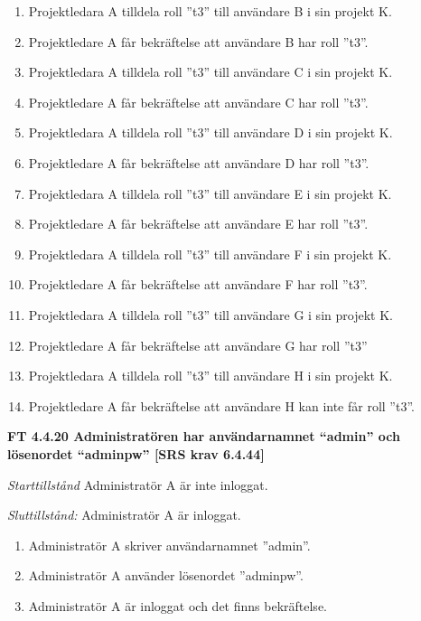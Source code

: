 \documentclass[a4paper]{article}
\begin{document}
\begin{enumerate}
\item Projektledara A tilldela roll ”t3” till användare B i sin projekt K. 
\item Projektledare A får bekräftelse att användare B har roll ”t3”.
\item Projektledara A tilldela roll ”t3” till användare C i sin projekt K. 
\item Projektledare A får bekräftelse att användare C har roll ”t3”.
\item Projektledara A tilldela roll ”t3” till användare D i sin projekt K. 
\item Projektledare A får bekräftelse att användare D har roll ”t3”.
\item Projektledara A tilldela roll ”t3” till användare E i sin projekt K. 
\item Projektledare A får bekräftelse att användare E har roll ”t3”.
\item Projektledara A tilldela roll ”t3” till användare F i sin projekt K.
\item Projektledare A får bekräftelse att användare F har roll ”t3”.
\item Projektledara A tilldela roll ”t3” till användare G i sin projekt K. 
\item Projektledare A får bekräftelse att användare G har roll ”t3”
\item Projektledara A tilldela roll ”t3” till användare H i sin projekt K. 
\item Projektledare A får bekräftelse att användare H kan inte får roll ”t3”.
\end{enumerate}

\textbf{FT 4.4.20 Administratören har användarnamnet “admin” och lösenordet “adminpw” [SRS krav 6.4.44]}

\emph{Starttillstånd} Administratör A är inte inloggat.

\emph{Sluttillstånd:} Administratör A är inloggat.

\begin{enumerate}
\item Administratör A  skriver användarnamnet ”admin”.
\item Administratör A  använder lösenordet ”adminpw”.
\item Administratör A  är inloggat och det finns bekräftelse.
\end{enumerate}
\end{document}
